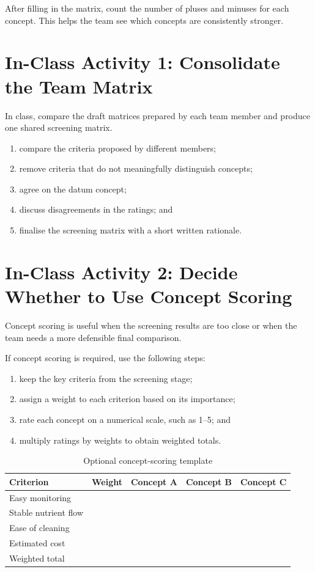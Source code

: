 After filling in the matrix, count the number of pluses and minuses for each concept. This helps the team see which concepts are consistently stronger.

\section{In-Class Activity 1: Consolidate the Team Matrix}

In class, compare the draft matrices prepared by each team member and produce one shared screening matrix.

\begin{enumerate}
    \item compare the criteria proposed by different members;
    \item remove criteria that do not meaningfully distinguish concepts;
    \item agree on the datum concept;
    \item discuss disagreements in the ratings; and
    \item finalise the screening matrix with a short written rationale.
\end{enumerate}

\section{In-Class Activity 2: Decide Whether to Use Concept Scoring}

Concept scoring is useful when the screening results are too close or when the team needs a more defensible final comparison.

If concept scoring is required, use the following steps:
\begin{enumerate}
    \item keep the key criteria from the screening stage;
    \item assign a weight to each criterion based on its importance;
    \item rate each concept on a numerical scale, such as 1--5; and
    \item multiply ratings by weights to obtain weighted totals.
\end{enumerate}

\begin{table}[htbp]
\centering
\caption{Optional concept-scoring template}
\label{tab:session11-scoring-template}
\renewcommand{\arraystretch}{1.2}
\begin{tabularx}{\textwidth}{|>{\raggedright\arraybackslash}p{}|c|c|c|c|}
\hline
\textbf{Criterion} & \textbf{Weight} & \textbf{Concept A} & \textbf{Concept B} & \textbf{Concept C} \\
\hline
Easy monitoring &  &  &  &  \\
\hline
Stable nutrient flow &  &  &  &  \\
\hline
Ease of cleaning &  &  &  &  \\
\hline
Estimated cost &  &  &  &  \\
\hline
Weighted total &  &  &  &  \\
\hline
\end{tabularx}
\end{table}

